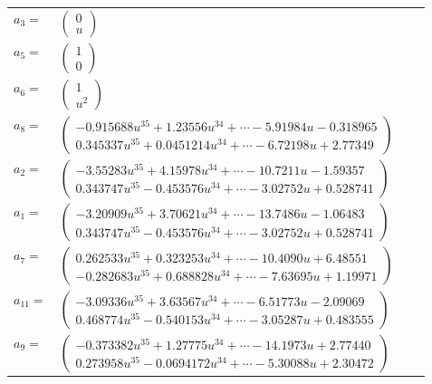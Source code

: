 \documentclass[1p]{elsarticle_modified}
\theoremstyle{definition}
\begin{document}
\begin{tabular}{m{7pt} m{180pt} m{7pt} m{180pt} }
\flushright $a_{3}=$&$\begin{pmatrix}0\\u\end{pmatrix}$ \\
\flushright $a_{5}=$&$\begin{pmatrix}1\\0\end{pmatrix}$ \\
\flushright $a_{6}=$&$\begin{pmatrix}1\\u^2\end{pmatrix}$ \\
\flushright $a_{8}=$&$\begin{pmatrix}-0.915688 u^{35}+1.23556 u^{34}+\cdots-5.91984 u-0.318965\\0.345337 u^{35}+0.0451214 u^{34}+\cdots-6.72198 u+2.77349\end{pmatrix}$ \\
\flushright $a_{2}=$&$\begin{pmatrix}-3.55283 u^{35}+4.15978 u^{34}+\cdots-10.7211 u-1.59357\\0.343747 u^{35}-0.453576 u^{34}+\cdots-3.02752 u+0.528741\end{pmatrix}$ \\
\flushright $a_{1}=$&$\begin{pmatrix}-3.20909 u^{35}+3.70621 u^{34}+\cdots-13.7486 u-1.06483\\0.343747 u^{35}-0.453576 u^{34}+\cdots-3.02752 u+0.528741\end{pmatrix}$ \\
\flushright $a_{7}=$&$\begin{pmatrix}0.262533 u^{35}+0.323253 u^{34}+\cdots-10.4090 u+6.48551\\-0.282683 u^{35}+0.688828 u^{34}+\cdots-7.63695 u+1.19971\end{pmatrix}$ \\
\flushright $a_{11}=$&$\begin{pmatrix}-3.09336 u^{35}+3.63567 u^{34}+\cdots-6.51773 u-2.09069\\0.468774 u^{35}-0.540153 u^{34}+\cdots-3.05287 u+0.483555\end{pmatrix}$ \\
\flushright $a_{9}=$&$\begin{pmatrix}-0.373382 u^{35}+1.27775 u^{34}+\cdots-14.1973 u+2.77440\\0.273958 u^{35}-0.0694172 u^{34}+\cdots-5.30088 u+2.30472\end{pmatrix}$ \\

\end{tabular}
\end{document}
